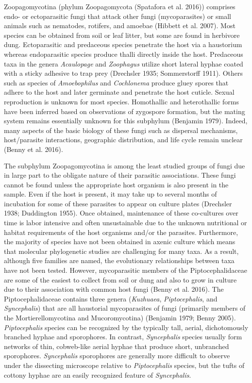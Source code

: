 \documentclass[]{book}
\begin{document}
Zoopagomycotina (phylum Zoopagomycota (Spatafora et al. 2016)) comprises
endo- or ectoparasitic fungi that attack other fungi (mycoparasites) or
small animals such as nematodes, rotifers, and amoebae (Hibbett et al.
2007). Most species can be obtained from soil or leaf litter, but some
are found in herbivore dung. Ectoparasitic and predaceous species
penetrate the host via a haustorium whereas endoparasitic species
produce thalli directly inside the host. Predaceous taxa in the genera
\emph{Acaulopage} and \emph{Zoophagus} utilize short lateral hyphae
coated with a sticky adhesive to trap prey (Drechsler 1935; Sommerstorff
1911). Others such as species of \emph{Amoebophilus} and
\emph{Cochlonema} produce gluey spores that adhere to the host and later
germinate and penetrate the host cuticle. Sexual reproduction is unknown
for most species. Homothallic and heterothallic forms have been inferred
based on observations of zygospore formation, but the mating system
remains essentially unknown for this subphylum (Benjamin 1979). Indeed,
many aspects of the basic biology of these fungi such as dispersal
mechanisms, host/parasite interactions, geographic distribution, and
life cycle remain unclear (Benny et al. 2016).

The subphylum Zoopagomycotina is among the least studied groups of fungi
due in large part to the obligate nature of their parasitic
associations. These fungi cannot be found unless the appropriate host
organism is also present in the sample. Even if the host is present, it
may take up to several months of incubation for some of these parasites
to appear on culture plates (Drechsler 1938; Duddington 1955). Once
obtained, maintenance of these co-cultures over time is labor intensive
and often unsustainable due to the unknown nutritional or habitat
requirements of the host organisms and/or the parasites. Furthermore,
the majority of species have not been obtained in axenic culture which
means that molecular phylogenetic studies are challenging for many taxa.
As a result, although five families are named, the evolutionary
relationships between taxa have not been tested. However, mycoparasitic
members of the Piptocephalidaceae are some of the easiest to collect
from soil or dung and also to grow in culture due to their association
with common host fungi (Benny et al. 2016). The Piptocephalidaceae
contains three genera (\emph{Kuzhuaea}, \emph{Piptocephalis}, and
\emph{Syncephalis}) that are all haustorial mycoparasites of fungi
(primarily members of the Mortierellomycotina and Mucoromycotina)
(Benjamin 1979; Benny 2005). \emph{Piptocephalis} species can be
recognized by the typically tall, aerial, dichotomously branched hyphae
and sporophores. In contrast, \emph{Syncephalis} species usually form
networks of thin, cobweb-like aerial hyphae that produce short,
unbranched sporophores. \emph{Syncephalis} sporophores are generally
more difficult to observe under the dissecting microscope relative to
\emph{Piptocephalis} species, but the tufts of cottony hyphae are an
easily recognized feature of \emph{Syncephalis}.
\end{document}
